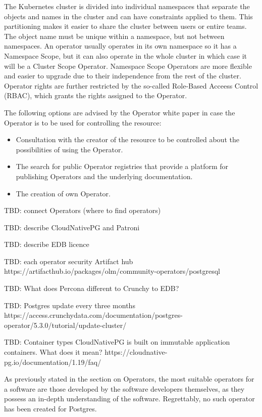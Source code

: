 The Kubernetes cluster is divided into individual namespaces that separate the objects and names in the cluster and can have constraints applied to them. This partitioning makes it easier to share the cluster between users or entire teams. The object name must be unique within a namespace, but not between namespaces.  An operator usually operates in its own namespace so it has a Namespace Scope, but it can also operate in the whole cluster in which case it will be a Cluster Scope Operator. Namespace Scope Operators are more flexible and easier to upgrade due to their independence from the rest of the cluster. Operator rights are further restricted by the so-called Role-Based Acceess Control (RBAC), which grants the rights assigned to the Operator. \cite{ OperatorsAtK8sIface}

The following options are advised by the Operator white paper \cite{OperatorsOframework} in case the Operator is to be used for controlling the resource:
\begin{itemize}
  \item	Consultation with the creator of the resource to be controlled about the possibilities of using the Operator.
  \item	The search for public Operator registries that provide a platform for publishing Operators and the underlying documentation.
  \item	The creation of own Operator.
\end{itemize}


TBD: connect Operators (where to find operators)

TBD: describe CloudNativePG and Patroni

TBD: describe EDB licence

TBD: each operator security Artifact hub https://artifacthub.io/packages/olm/community-operators/postgresql

TBD: What does Percona different to Crunchy to EDB?

TBD: Postgres update every three months https://access.crunchydata.com/documentation/postgres-operator/5.3.0/tutorial/update-cluster/

TBD: Container types CloudNativePG is built on immutable application containers. What does it mean? https://cloudnative-pg.io/documentation/1.19/faq/

As previously stated in the section on Operators, the most suitable operators for a software are those developed by the software developers themselves, as they possess an in-depth understanding of the software. Regrettably, no such operator has been created for Postgres.

